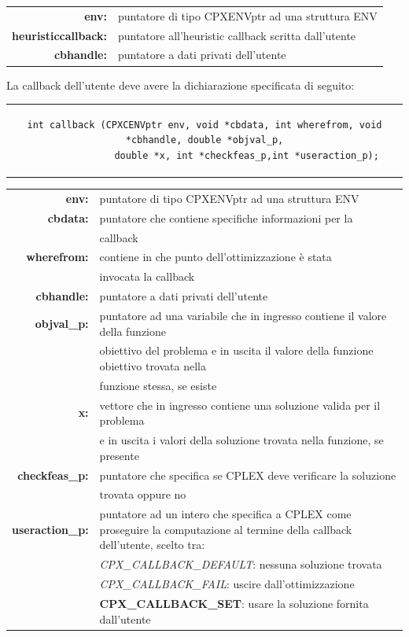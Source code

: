 \begin{table}[h]
\centering
\begin{tabular}{rl}
\textbf{env:} & {puntatore di tipo CPXENVptr ad una struttura ENV}\\
\textbf{heuristiccallback:} & {puntatore all'heuristic callback scritta dall'utente}\\
\textbf{cbhandle:} & {puntatore a dati privati dell'utente}\\
\end{tabular}
\end{table}
La callback dell'utente deve avere la dichiarazione specificata di seguito:
\begin{center}
\begin{tabular}{c}
\begin{lstlisting}[linewidth=382pt, basicstyle=\footnotesize\sffamily,] 
 int callback (CPXCENVptr env, void *cbdata, int wherefrom, void *cbhandle, double *objval_p,
               double *x, int *checkfeas_p,int *useraction_p);
\end{lstlisting}
\end{tabular}
\end{center}
\begin{table}[h]
\centering
\begin{tabular}{rl}
\textbf{env:} & {puntatore di tipo CPXENVptr ad una struttura ENV}\\
\textbf{cbdata:} & {puntatore che contiene specifiche informazioni per la}\\
&{callback}\\
\textbf{wherefrom:} & {contiene in che punto dell'ottimizzazione è stata} \\ 
&{invocata la callback}\\
\textbf{cbhandle:} & {puntatore a dati privati dell'utente}\\
\textbf{objval\_p:} & {puntatore ad una variabile che in ingresso contiene il valore della funzione}\\
&{ obiettivo del problema e in uscita il valore della funzione obiettivo trovata nella }\\
&{funzione stessa, se esiste}\\
\textbf{x:} & {vettore che in ingresso contiene una soluzione valida per il problema }\\
&{e in uscita i valori della soluzione trovata nella funzione, se presente}\\
\textbf{checkfeas\_p:} & {puntatore che specifica se CPLEX deve verificare la soluzione }\\
&{trovata oppure no}\\
\textbf{useraction\_p:} & {puntatore ad un intero che specifica a CPLEX come proseguire la computazione al termine della callback dell'utente, scelto tra:}\\
&{\textit{CPX\_CALLBACK\_DEFAULT}: nessuna soluzione trovata}\\
&{\textit{CPX\_CALLBACK\_FAIL}: uscire dall'ottimizzazione}\\
&{\textbf{CPX\_CALLBACK\_SET}}: usare la soluzione fornita dall'utente\\
\end{tabular}
\end{table}


